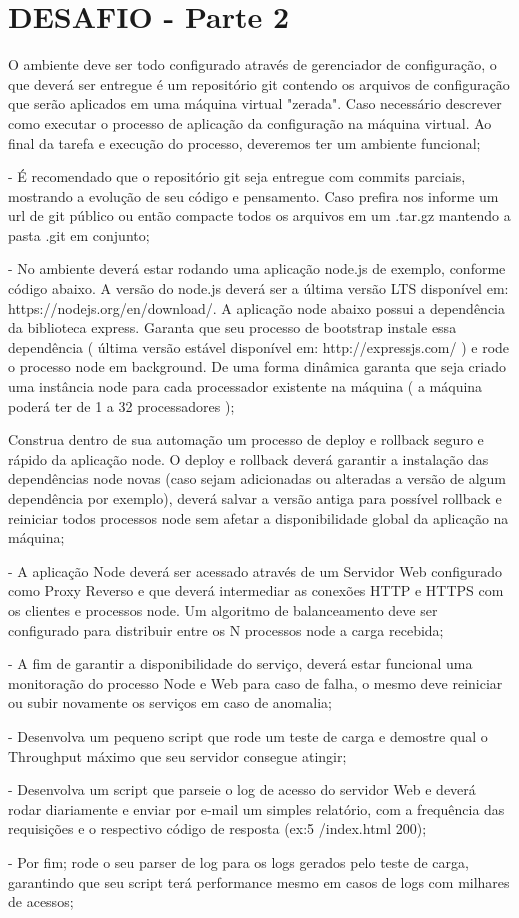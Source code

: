 \section{DESAFIO - Parte 2}

O ambiente deve ser todo configurado através de gerenciador de configuração, o que deverá ser entregue é um repositório git contendo os arquivos de configuração que serão aplicados em uma máquina virtual "zerada". Caso necessário descrever como executar o processo de aplicação da configuração na máquina virtual. Ao final da tarefa e execução do processo, deveremos ter um ambiente funcional;

- É recomendado que o repositório git seja entregue com commits parciais, mostrando a evolução de seu código e pensamento. Caso prefira nos informe um url de git público ou então compacte todos os arquivos em um .tar.gz mantendo a pasta .git em conjunto;

- No ambiente deverá estar rodando uma aplicação node.js de exemplo,
conforme código abaixo. A versão do node.js deverá ser a última versão
LTS disponível em: https://nodejs.org/en/download/. A aplicação node
abaixo possui a dependência da biblioteca express. Garanta que seu
processo de bootstrap instale essa dependência ( última versão estável
disponível em: http://expressjs.com/ ) e rode o processo node em
background. De uma forma dinâmica garanta que seja criado uma
instância node para cada processador existente na máquina ( a máquina
poderá ter de 1 a 32 processadores );

Construa dentro de sua automação um processo de deploy e rollback seguro e rápido da aplicação node. O deploy e rollback deverá garantir a instalação das dependências node novas (caso sejam adicionadas ou alteradas a versão de algum dependência por exemplo), deverá salvar a versão antiga para possível rollback e reiniciar todos processos node sem afetar a disponibilidade global da aplicação na máquina;

- A aplicação Node deverá ser acessado através de um Servidor Web configurado como Proxy Reverso e que deverá intermediar as conexões HTTP e HTTPS com os clientes e processos node. Um algoritmo de balanceamento deve ser configurado para distribuir entre os N processos node a carga recebida;

- A fim de garantir a disponibilidade do serviço, deverá estar funcional uma monitoração do processo Node e Web para caso de falha, o mesmo deve reiniciar ou subir novamente os serviços em caso de anomalia;

- Desenvolva um pequeno script que rode um teste de carga e demostre qual o Throughput máximo que seu servidor consegue atingir;

- Desenvolva um script que parseie o log de acesso do servidor Web e deverá rodar diariamente e enviar por e-mail um simples relatório, com a frequência das requisições e o respectivo código de resposta (ex:5 /index.html 200);

- Por fim; rode o seu parser de log para os logs gerados pelo teste de carga, garantindo que seu script terá performance mesmo em casos de logs com milhares de acessos;